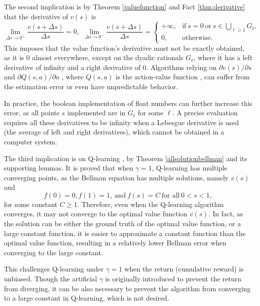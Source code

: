 \documentclass{article}
\theoremstyle{named}
\begin{document}
The second implication is by Theorem \ref{valuefunction} and Fact \ref{thm:derivative} that the derivative of $v(s)$ is
\begin{equation*}
\lim_{\Delta s \rightarrow 0^+}\frac{v(s+\Delta s)}{\Delta s} = 0, \ \ \lim_{\Delta s \rightarrow 0^-}\frac{v(s+\Delta s)}{\Delta s} =
\begin{cases}
+\infty, & \text{if}\ s=0 \ \text{or} \ s\in\bigcup_{\ell\geq 1} G_\ell, \\
0, & \text{otherwise}.
\end{cases}
\end{equation*}
This imposes that the value function's derivative must not be exactly obtained, as it is $0$ almost everywhere, except on the dyadic rationals $G_\ell$, where it has a left derivative of infinity and a right derivative of $0$. Algorithms relying on $\partial v(s)/\partial s$ and $\partial Q(s,a)/\partial a$ \citep{lillicrap2015continuous,gu2017interpolated,heess2015learning,fairbank2012value,fairbank2008reinforcement,pan2019hill,lim2018actor}, where $Q(s,a)$ is the action-value function \citep{sutton2018reinforcement}, can suffer from the estimation error or even have unpredictable behavior. 

In practice, the boolean implementation of float numbers can further increase this error, as all points $s$ implemented are in $G_\ell$ for some $\ell$. A precise evaluation requires all these derivatives to be infinity when a Lebesgue derivative is used (the average of left and right derivatives), which cannot be obtained in a computer system. 

The third implication is on Q-learning \citep{mnih2015human,watkins1992q,baird1995residual}, by Theorem \ref{allsolutionbellman} and its supporting lemmas. It is proved that when $\gamma=1$, Q-learning has multiple converging points, as the Bellman equation has multiple solutions, namely $v(s)$ and
\[f(0)=0, f(1)=1,\ \text{and}\ f(s)=C \ \text{for all}\ 0<s<1, \]
for some constant $C\geq 1$.
Therefore, even when the Q-learning algorithm converges, it may not converge to the optimal value function $v(s)$. In fact, as the solution can be either the ground truth of the optimal value function, or a large constant function, it is easier to approximate a constant function than the optimal value function, resulting in a relatively lower Bellman error when converging to the large constant. 

This challenges Q-learning under $\gamma=1$ when the return (cumulative reward) is unbiased. Though the artificial $\gamma$ is originally introduced to prevent the return from diverging, it can be also necessary to prevent the algorithm from converging to a large constant in Q-learning, which is not desired.
\end{document}
